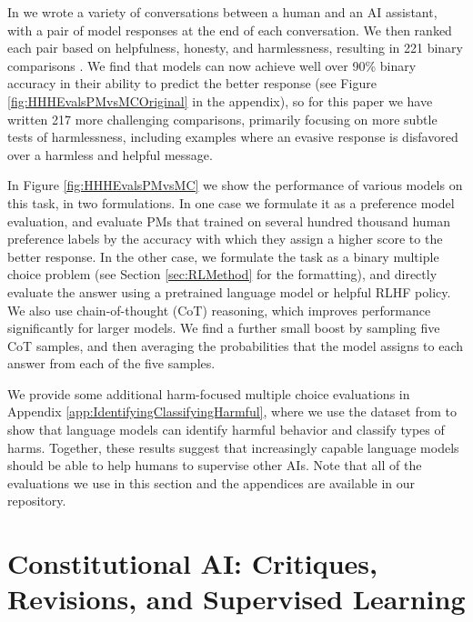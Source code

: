\documentclass[english]{article}
\renewcommand\>{\rangle}
\begin{document}
In \cite{askell2021general} we  wrote  a variety of conversations between a human and an AI assistant, with a pair of model responses at the end of each conversation. We then ranked each pair based on helpfulness, honesty, and harmlessness, resulting in 221 binary comparisons \cite{BIGBench}. We find that models can now achieve well over 90\% binary accuracy in their ability to predict the better response (see Figure \ref{fig:HHHEvalsPMvsMCOriginal} in the appendix), so for this paper we have written 217 more challenging comparisons, primarily focusing on more subtle tests of harmlessness, including examples where an evasive response is disfavored over a harmless and helpful message. %

In Figure \ref{fig:HHHEvalsPMvsMC} we show the performance of various models on this task, in two formulations.  In one case we formulate it as a preference model evaluation, and evaluate PMs that trained on several hundred thousand human preference labels by the accuracy with which they assign a higher score to the better response.  In the other case, we formulate the task as a binary multiple choice problem (see Section \ref{sec:RLMethod} for the formatting), and directly evaluate the answer using a pretrained language model or helpful RLHF policy. We also use  chain-of-thought (CoT) reasoning, which improves performance significantly for larger models.  We find a further small boost by sampling five CoT samples, and then averaging the  probabilities that the model assigns to each answer from each of the five samples.

We provide some additional harm-focused multiple choice evaluations in Appendix \ref{app:IdentifyingClassifyingHarmful}, where we use the dataset from \cite{DeepRedTeaming} to show that language models can identify harmful behavior and classify types of harms.   Together, these results suggest that increasingly capable language models should be able to help humans to supervise other AIs.  Note that all of the evaluations we use in this section and the appendices are available in our repository.


\section{Constitutional AI: Critiques, Revisions, and Supervised Learning}

\label{sec:SLCAI}
\end{document}
